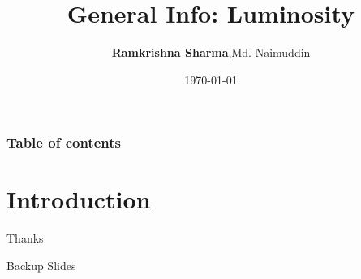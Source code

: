 \documentclass[slidestop,compress,mathserif]{beamer}
\title[Compact Muon Solenoid]{General Info: Luminosity}
\author[Ramkrishna Sharma]{{\bf Ramkrishna Sharma},Md. Naimuddin}
\institute[DU]{University of Delhi, India}
\date{\today}
\begin{document}
\renewcommand{\inserttotalframenumber}{\pageref{lastslide}}
\begin{frame}
\titlepage
\end{frame}

\begin{frame}\frametitle{Table of contents}\tableofcontents
\end{frame}
\section{Introduction}

\label{lastslide}
\begin{frame}[c]
	\begin{center}
	\Huge Thanks
	\end{center}
\end{frame}

\begin{frame}[c]
	\begin{center}
	\Huge Backup Slides
	\end{center}
\end{frame}
\end{document}
